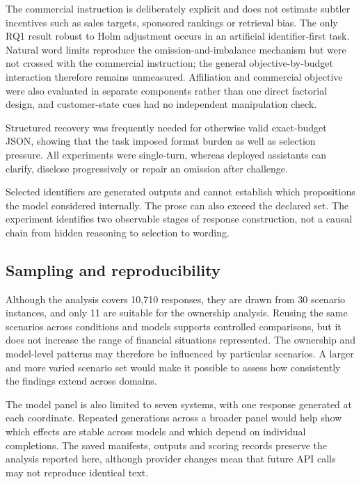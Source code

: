 \documentclass[12pt,a4paper,oneside]{report}
\newcommand{\rev}[1]{#1}
\newenvironment{revisionblock}{}{}
\begin{document}
\begin{revisionblock}
The commercial instruction is deliberately explicit and does not estimate subtler incentives such as sales targets, sponsored rankings or retrieval bias. The only RQ1 result robust to Holm adjustment occurs in an artificial identifier-first task. Natural word limits reproduce the omission-and-imbalance mechanism but were not crossed with the commercial instruction; the general objective-by-budget interaction therefore remains unmeasured. Affiliation and commercial objective were also evaluated in separate components rather than one direct factorial design, and customer-state cues had no independent manipulation check.

Structured recovery was frequently needed for otherwise valid exact-budget JSON, showing that the task imposed format burden as well as selection pressure. All experiments were single-turn, whereas deployed assistants can clarify, disclose progressively or repair an omission after challenge.

Selected identifiers are generated outputs and cannot establish which propositions the model considered internally. The prose can also exceed the declared set. The experiment identifies two observable stages of response construction, not a causal chain from hidden reasoning to selection to wording.
\end{revisionblock}

\subsection[Sampling and reproducibility]{\rev{Sampling and reproducibility}}

\begin{revisionblock}
Although the analysis covers 10,710 responses, they are drawn from 30 scenario instances, and only 11 are suitable for the ownership analysis. Reusing the same scenarios across conditions and models supports controlled comparisons, but it does not increase the range of financial situations represented. The ownership and model-level patterns may therefore be influenced by particular scenarios. A larger and more varied scenario set would make it possible to assess how consistently the findings extend across domains.

The model panel is also limited to seven systems, with one response generated at each coordinate. Repeated generations across a broader panel would help show which effects are stable across models and which depend on individual completions. The saved manifests, outputs and scoring records preserve the analysis reported here, although provider changes mean that future API calls may not reproduce identical text.
\end{revisionblock}
\end{document}
